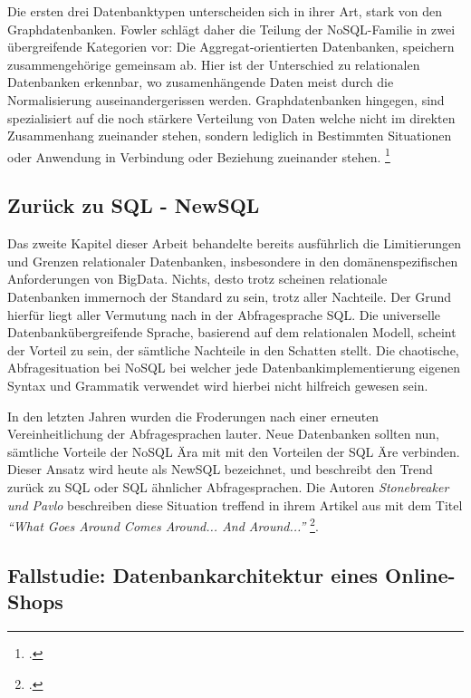 Die ersten drei Datenbanktypen unterscheiden sich in ihrer Art, stark von den Graphdatenbanken. Fowler schlägt daher die Teilung der NoSQL-Familie  in zwei übergreifende Kategorien vor: Die Aggregat-orientierten Datenbanken, speichern zusammengehörige gemeinsam ab. Hier ist der Unterschied zu relationalen Datenbanken erkennbar, wo zusamenhängende Daten meist durch die Normalisierung auseinandergerissen werden. Graphdatenbanken hingegen, sind spezialisiert auf die noch stärkere Verteilung von Daten welche nicht im direkten Zusammenhang zueinander stehen, sondern lediglich in Bestimmten Situationen oder Anwendung in Verbindung oder Beziehung zueinander stehen. \footcite{fowlerAggregateOrientedDatabase2012}

\subsection{Zurück zu SQL - NewSQL}

Das zweite Kapitel dieser Arbeit behandelte bereits ausführlich die Limitierungen und Grenzen relationaler Datenbanken, insbesondere in den domänenspezifischen Anforderungen von BigData. Nichts, desto trotz scheinen relationale Datenbanken immernoch der Standard zu sein, trotz aller Nachteile. Der Grund hierfür liegt aller Vermutung nach in der Abfragesprache SQL. Die universelle Datenbankübergreifende Sprache, basierend auf dem relationalen Modell, scheint der Vorteil zu sein, der sämtliche Nachteile in den Schatten stellt. Die chaotische, Abfragesituation bei NoSQL bei welcher jede Datenbankimplementierung eigenen Syntax und Grammatik verwendet wird hierbei nicht hilfreich gewesen sein. 

In den letzten Jahren wurden die Froderungen nach einer erneuten Vereinheitlichung der Abfragesprachen lauter. Neue Datenbanken sollten nun, sämtliche Vorteile der NoSQL Ära mit mit den Vorteilen der SQL Äre verbinden. Dieser Ansatz wird heute als NewSQL bezeichnet, und beschreibt den Trend zurück zu SQL oder SQL ähnlicher Abfragesprachen. Die Autoren \textit{Stonebreaker und Pavlo} beschreiben diese Situation treffend in ihrem Artikel aus mit dem Titel \textit{\enquote{What Goes Around Comes Around... And Around...}} \footcite{stonebrakerWhatGoesComes2024}.

\newpage

\subsection{Fallstudie: Datenbankarchitektur eines Online-Shops}


